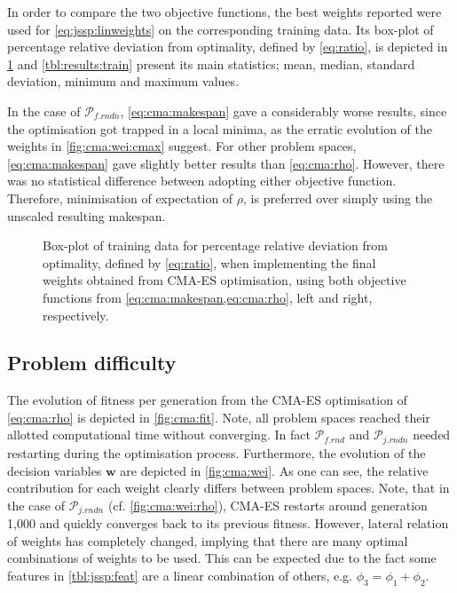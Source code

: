 \documentclass[graybox]{svmult}
\renewcommand{\vec}[1]{\mathbf{#1}}
\begin{document}
In order to compare the two objective functions, the best weights reported were 
used for \cref{eq:jssp:linweights} on the corresponding training data. Its 
box-plot of percentage relative deviation from optimality, defined by 
\cref{eq:ratio}, is depicted in \cref{fig:cma:trainboxpl} and 
\cref{tbl:results:train} present its main statistics; mean, median, standard 
deviation, minimum and maximum values.

In the case of $\mathcal{P}_{f.rndn}$, \cref{eq:cma:makespan}  gave a 
considerably worse results, since the optimisation got trapped in a local 
minima, as the erratic evolution of the weights in \cref{fig:cma:wei:cmax} 
suggest.
For other problem spaces, \cref{eq:cma:makespan} gave slightly better results 
than \cref{eq:cma:rho}. However, there was no statistical difference between 
adopting either objective function. Therefore, minimisation of expectation of 
$\rho$, is preferred over simply using the unscaled resulting makespan. 

\begin{figure}\centering
	\caption{Box-plot of training data for percentage relative deviation from 
		optimality, defined by \cref{eq:ratio}, when implementing the final weights 
		obtained from CMA-ES optimisation, using both objective functions from         
		\cref{eq:cma:makespan,eq:cma:rho}, left and right, respectively.}
	\label{fig:cma:trainboxpl}
\end{figure}

\subsection{Problem difficulty}\label{sec:expr:data}
The evolution of fitness per generation from the CMA-ES optimisation of 
\cref{eq:cma:rho} is depicted in \cref{fig:cma:fit}. Note, all problem spaces 
reached their allotted computational time without converging. In fact 
$\mathcal{P}_{f.rnd}$ and $\mathcal{P}_{j.rndn}$ needed restarting during the 
optimisation process. 
Furthermore, the  evolution of the decision variables $\vec{w}$ are depicted in 
\cref{fig:cma:wei}. As one can see, the relative contribution for each weight 
clearly differs between problem spaces. Note, that in the case of 
$\mathcal{P}_{j.rndn}$ (cf. \cref{fig:cma:wei:rho}), CMA-ES restarts around 
generation 1,000 and quickly converges back to its previous fitness. However, 
lateral relation of weights has completely changed, implying that there are 
many optimal combinations of weights to be used. This can be expected due  to 
the fact some features in \cref{tbl:jssp:feat} are a linear combination of 
others, e.g. $\phi_3=\phi_1+\phi_2$.
\end{document}
